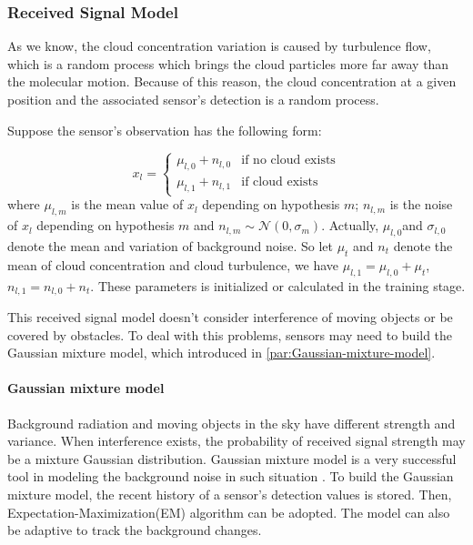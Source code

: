 \subsubsection{\label{sub:Received-Signal'-Model}Received Signal Model }

As we know, the cloud concentration variation is caused by turbulence
flow, which is a random process which brings the cloud particles more
far away than the molecular motion. Because of this reason, the cloud
concentration at a given position and the associated sensor's detection
is a random process. 

Suppose the sensor's observation has the following form:

\begin{equation}
x_{l}=\begin{cases}
\mu_{l,0}+n_{l,0} & \mbox{if no cloud exists}\\
\mu_{l,1}+n_{l,1} & \mbox{if cloud exists}
\end{cases}
\end{equation}
where $\mu_{l,m}$ is the mean value of $x_{l}$ depending on hypothesis
$m$; $n_{l,m}$ is the noise of $x_{l}$ depending on hypothesis
$m$ and $n_{l,m}\sim\mathcal{N}\left(0,\sigma_{m}\right)$. Actually,
$\mu_{l,0}$and $\sigma_{l,0}$ denote the mean and variation of background
noise. So let $\mu_{t}$ and $n_{t}$ denote the mean of cloud concentration
and cloud turbulence, we have $\mu_{l,1}=\mu_{l,0}+\mu_{t}$, $n_{l,1}=n_{l,0}+n_{t}$.
These parameters is initialized or calculated in the training stage.

This received signal model doesn't consider interference of moving
objects or be covered by obstacles. To deal with this problems, sensors
may need to build the Gaussian mixture model, which introduced in
\ref{par:Gaussian-mixture-model}. 


\paragraph{\label{par:Gaussian-mixture-model}Gaussian mixture model}

Background radiation and moving objects in the sky have different
strength and variance. When interference exists, the probability of
received signal strength may be a mixture Gaussian distribution. Gaussian
mixture model is a very successful tool in modeling the background
noise in such situation \cite{Stauffer1999}. To build the Gaussian
mixture model, the recent history of a sensor's detection values is
stored. Then, Expectation-Maximization(EM) algorithm \cite{Moon1996}
can be adopted. The model can also be adaptive to track the background
changes. 

